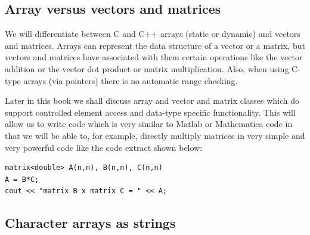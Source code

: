 
\subsection{Array versus vectors and matrices}

We will differentiate between C and C++ arrays (static or dynamic) and vectors
and matrices. Arrays can represent the data structure of a vector or a matrix,
but vectors and matrices have associated with them certain operations like
the vector addition or the vector dot product or matrix multiplication. Also,
when using C-type arrays (via pointers) there is no automatic range checking.

Later in this book we shall discuss array and vector and matrix classes which do
support controlled element access and data-type specific functionality. This will
allow us to write code which is very similar to Matlab or Mathematica code in
that we will be able to, for example, directly multiply matrices in very simple
and very powerful code like the code extract shown below:
{\small \begin{verbatim}
matrix<double> A(n,n), B(n,n), C(n,n)
A = B*C;
cout << "matrix B x matrix C = " << A;
\end{verbatim}}


\subsection{Character arrays as strings}

